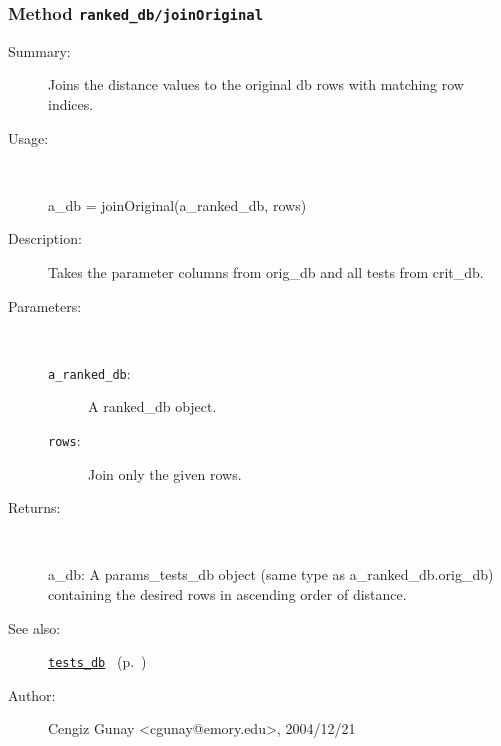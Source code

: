 \subsubsection[Method \texttt{joinOriginal}]{Method \texttt{ranked\_db/joinOriginal}}%
%
\label{ref_ranked_db__joinOriginal}%
\hypertarget{ref_ranked_db__joinOriginal}{}%
\begin{description}
\item[Summary:]Joins the distance values to the original db rows with matching row indices.
%
\item[Usage:]~%
\begin{lyxcode}%
a\_db = joinOriginal(a\_ranked\_db, rows)
%
\end{lyxcode}%
%
\item[Description:]%
Takes the parameter columns from orig\_db and all tests from crit\_db.
\item[Parameters:]~
\begin{description}%
\item[\texttt{a\_ranked\_db}:]
 A ranked\_db object.
\item[\texttt{rows}:]
 Join only the given rows.
\end{description}%
%
\item[Returns:]~

	a\_db: A params\_tests\_db object (same type as a\_ranked\_db.orig\_db) containing 
		the desired rows in ascending order of distance.
%
%
\item[See also:]%
\hyperlink{ref_tests_db}{\texttt{tests\_db}}%
\ (p.~\pageref{ref_tests_db})%
%
%
\item[Author:]%
Cengiz Gunay <cgunay@emory.edu>, 2004/12/21%
\end{description}
\methodline%
